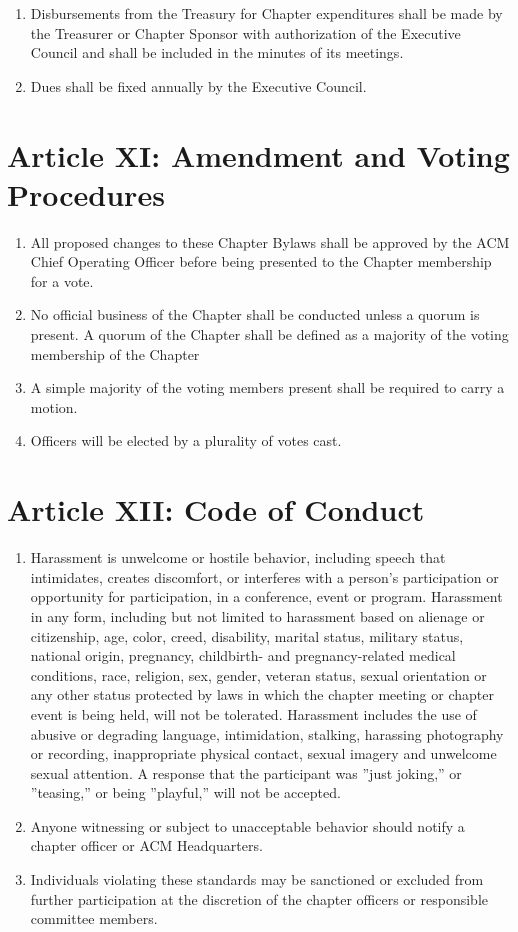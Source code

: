 \begin{enumerate}
	\item Disbursements from the Treasury for Chapter expenditures shall be made by the Treasurer or Chapter Sponsor with authorization of the Executive Council and shall be included in the minutes of its meetings.
	\item Dues shall be fixed annually by the Executive Council.
\end{enumerate}
 
\section*{Article XI: Amendment and Voting Procedures}
\begin{enumerate}
	\item All proposed changes to these Chapter Bylaws shall be approved by the ACM Chief Operating Officer before being presented to the Chapter membership for a vote.
	\item No official business of the Chapter shall be conducted unless a quorum is present. A quorum of the Chapter shall be defined as a majority of the voting membership of the Chapter
	\item A simple majority of the voting members present shall be required to carry a motion.
	\item Officers will be elected by a plurality of votes cast.
\end{enumerate}
 
\section*{Article XII: Code of Conduct}

\begin{enumerate}
	\item Harassment is unwelcome or hostile behavior, including speech that intimidates, creates discomfort, or interferes with a person's participation or opportunity for participation, in a conference, event or program. Harassment in any form, including but not limited to harassment based on alienage or citizenship, age, color, creed, disability, marital status, military status, national origin, pregnancy, childbirth- and pregnancy-related medical conditions, race, religion, sex, gender, veteran status, sexual orientation or any other status protected by laws in which the chapter meeting or chapter event is being held, will not be tolerated. Harassment includes the use of abusive or degrading language, intimidation, stalking, harassing photography or recording, inappropriate physical contact, sexual imagery and unwelcome sexual attention. A response that the participant was ''just joking,'' or ''teasing,'' or being ''playful,'' will not be accepted.
	\item Anyone witnessing or subject to unacceptable behavior should notify a chapter officer or ACM Headquarters.
	\item Individuals violating these standards may be sanctioned or excluded from further participation at the discretion of the chapter officers or responsible committee members.
\end{enumerate}

